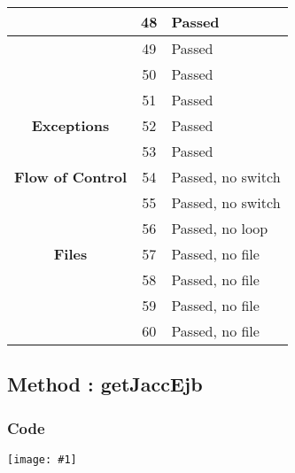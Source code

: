 \documentclass[11pt, a4paper,titlepage]{article}
\newcommand{\image}[1]{
	\begin{center}
		\noindent \texttt{[image: \#1]}
	\end{center}
	}
\begin{document}
  \begin{tabularx}{\textwidth}{| c |c |X |}
  	\hline  & 48 & Passed \\
  	\hline  & 49 & Passed \\
  	\hline  & 50 & Passed \\
  	\hline  & 51 & Passed \\
  	\hline \textbf{Exceptions} & 52 & Passed \\
  	\hline  & 53 & Passed \\
  	\hline \textbf{Flow of Control} & 54 & Passed, no switch \\
  	\hline  & 55 & Passed, no switch \\
  	\hline  & 56 & Passed, no loop \\
  	\hline \textbf{Files} & 57 & Passed, no file \\
  	\hline  & 58 & Passed, no file \\
  	\hline  & 59 & Passed, no file \\
  	\hline  & 60 & Passed, no file \\
  	\hline
  \end{tabularx}


\newpage
\subsection{Method : getJaccEjb }
\subsubsection{Code}
\image{code_4.png}
\newpage
\end{document}
